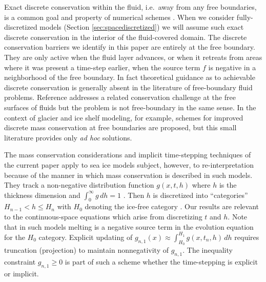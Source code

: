 \documentclass[final,leqno,onefignum,onetabnum]{siamltex1213bueler}
\begin{document}
Exact discrete conservation within the fluid, i.e.~away from any free boundaries, is a common goal and property of numerical schemes \cite[and references therein]{LeVeque2002}.  When we consider fully-discretized models (Section \ref{sec:spacediscretized}) we will assume such exact discrete conservation in the interior of the fluid-covered domain.  The discrete conservation barriers we identify in this paper are entirely at the free boundary.  They are only active when the fluid layer advances, or when it retreats from areas where it was present a time-step earlier, when the source term $f$ is negative in a neighborhood of the free boundary.  In fact theoretical guidance as to achievable discrete conservation is generally absent in the literature of free-boundary fluid problems.  Reference \cite{IdelsohnOnate2010} addresses a related conservation challenge at the free surfaces of fluids but the problem is not free-boundary in the same sense.  In the context of glacier \cite{JaroschSchoofAnslow2013} and ice shelf \cite{Albrechtetal2011} modeling, for example, schemes for improved discrete mass conservation at free boundaries are proposed, but this small literature provides only \emph{ad hoc} solutions.

The mass conservation considerations and implicit time-stepping techniques of the current paper apply to sea ice models subject, however, to re-interpretation because of the manner in which mass conservation is described in such models.  They track a non-negative distribution function $g(x,t,h)$ where $h$ is the thickness dimension and $\int_0^\infty g\,dh = 1$ \cite{Thorndikeetal1975}.  Then $h$ is discretized into ``categories'' $H_{n-1} < h \le H_n$ with $H_0$ denoting the ice-free category \cite{LipscombHunke2004}.  Our results are relevant to the continuous-space equations which arise from discretizing $t$ and $h$.  Note that in such models melting is a negative source term in the evolution equation for the $H_0$ category.  Explicit updating of $g_{n,1}(x) \approx \int_{H_0}^{H_1} g(x,t_n,h)\,dh$ requires truncation (projection) to maintain nonnegativity of $g_{n,1}$.  The inequality constraint $g_{n,1} \ge 0$ is part of such a scheme whether the time-stepping is explicit or implicit.
\end{document}
